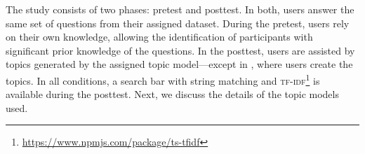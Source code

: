 %
%

%
The study consists of two phases: pretest and posttest. 
%
In both, users answer the same set of questions from their assigned dataset. 
%
During the pretest, users rely on their own knowledge, allowing the identification of participants with significant prior knowledge of the questions. 
%
In the posttest, users are assisted by topics generated by the assigned topic model---except in \bass{}, where users create the topics. 
%
In all conditions, a search bar with string matching and \textsc{tf-idf}\footnote{\url{https://www.npmjs.com/package/ts-tfidf}} is available during the posttest.
%
%
%
%
Next, we discuss the details of the topic models used.


